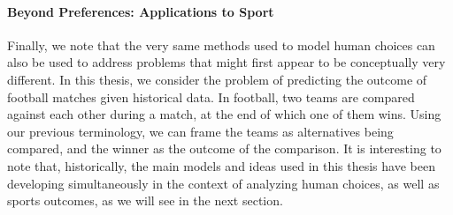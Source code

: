\paragraph{Beyond Preferences: Applications to Sport}
Finally, we note that the very same methods used to model human choices can also be used to address problems that might first appear to be conceptually very different.
In this thesis, we consider the problem of predicting the outcome of football matches given historical data.
In football, two teams are compared against each other during a match, at the end of which one of them wins.
Using our previous terminology, we can frame the teams as alternatives being compared, and the winner as the outcome of the comparison.
It is interesting to note that, historically, the main models and ideas used in this thesis have been developing simultaneously in the context of analyzing human choices, as well as sports outcomes, as we will see in the next section.
